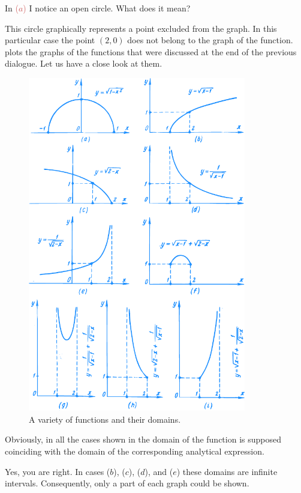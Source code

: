 {\rdr In \textcolor{IndianRed}{($a$)} I notice an open circle. What does it mean?

\athr This circle graphically represents a point excluded from the graph. In this particular case the point $(2, 0)$ does not belong to the graph of the function.
 plots the graphs of the functions that were discussed at the end of the previous dialogue. Let us have a close look at them.

\begin{figure}[!h]
\centering
\includegraphics[width=0.85\textwidth]{figures/fig-15.pdf}
\caption{A variety of functions and their domains.}
\label{fig-15}
\end{figure}

\rdr Obviously, in all the cases shown in  the domain of the function is supposed coinciding with the domain of the corresponding analytical expression.

\athr Yes, you are right. In cases ($b$), ($c$), ($d$), and ($e$) these domains are infinite intervals. Consequently, only a part of each graph could be shown.

}
